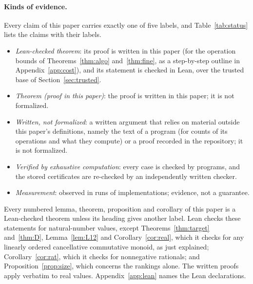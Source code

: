 \documentclass[runningheads,11pt]{llncs}
\begin{document}
\paragraph{Kinds of evidence.} Every claim of this paper carries exactly one of five labels, and Table~\ref{tab:status} lists the claims with their labels.
\begin{itemize}
\item \emph{Lean-checked theorem}: its proof is written in this paper (for the operation bounds of Theorems~\ref{thm:algo} and~\ref{thm:fine}, as a step-by-step outline in Appendix~\ref{app:cost}), and its statement is checked in Lean, over the trusted base of Section~\ref{sec:trusted}.
\item \emph{Theorem (proof in this paper)}: the proof is written in this paper; it is not formalized.
\item \emph{Written, not formalized}: a written argument that relies on material outside this paper's definitions, namely the text of a program (for counts of its operations and what they compute) or a proof recorded in the repository; it is not formalized.
\item \emph{Verified by exhaustive computation}: every case is checked by programs, and the stored certificates are re-checked by an independently written checker.
\item \emph{Measurement}: observed in runs of implementations; evidence, not a guarantee.
\end{itemize}
Every numbered lemma, theorem, proposition and corollary of this paper is a Lean-checked theorem unless its heading gives another label. Lean checks these statements for natural-number values, except Theorems~\ref{thm:target} and~\ref{thm:D}, Lemma~\ref{lem:L12} and Corollary~\ref{cor:real}, which it checks for any linearly ordered cancellative commutative monoid, as just explained; Corollary~\ref{cor:rat}, which it checks for nonnegative rationals; and Proposition~\ref{prop:size}, which concerns the rankings alone. The written proofs apply verbatim to real values. Appendix~\ref{app:lean} names the Lean declarations.
\end{document}
